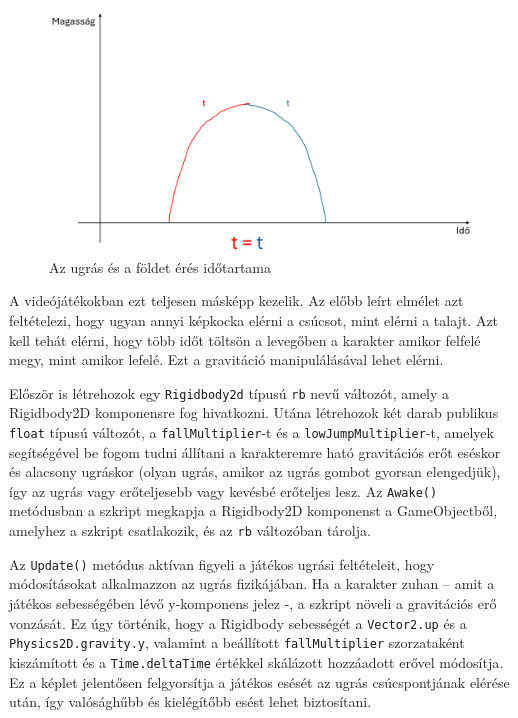 \begin{figure}[ht]
\centering
\includegraphics[width=\linewidth]{images/betterjumpgraph.png}
\caption{Az ugrás és a földet érés időtartama\cite{betterjump}}
\label{fig:betterjumpgraph}
\end{figure}

A videójátékokban ezt teljesen másképp kezelik. Az előbb leírt elmélet azt feltételezi, hogy ugyan annyi képkocka elérni a csúcsot, mint elérni a talajt. Azt kell tehát elérni, hogy több időt töltsön a levegőben a karakter amikor felfelé megy, mint amikor lefelé. Ezt a gravitáció manipulálásával lehet elérni.\cite{betterjump}

Először is létrehozok egy \texttt{Rigidbody2d} típusú \texttt{rb} nevű változót, amely a Rigidbody2D komponensre fog hivatkozni. Utána létrehozok két darab publikus \texttt{float} típusú változót, a \texttt{fallMultiplier}-t és a \texttt{lowJumpMultiplier}-t, amelyek segítségével be fogom tudni állítani a karakteremre ható gravitációs erőt eséskor és alacsony ugráskor (olyan ugrás, amikor az ugrás gombot gyorsan elengedjük), így az ugrás vagy erőteljesebb vagy kevésbé erőteljes lesz. Az \texttt{Awake()} metódusban a szkript megkapja a Rigidbody2D komponenst a GameObjectből, amelyhez a szkript csatlakozik, és az \texttt{rb} változóban tárolja.

Az \texttt{Update()} metódus aktívan figyeli a játékos ugrási feltételeit, hogy módosításokat alkalmazzon az ugrás fizikájában. Ha a karakter zuhan – amit a játékos sebességében lévő y-komponens jelez -, a szkript növeli a gravitációs erő vonzását. Ez úgy történik, hogy a Rigidbody sebességét a \texttt{Vector2.up} és a \texttt{Physics2D.gravity.y}, valamint a beállított \texttt{fallMultiplier} szorzataként kiszámított és a \texttt{Time.deltaTime} értékkel skálázott hozzáadott erővel módosítja. Ez a képlet jelentősen felgyorsítja a játékos esését az ugrás csúcspontjának elérése után, így valósághűbb és kielégítőbb esést lehet biztosítani.

